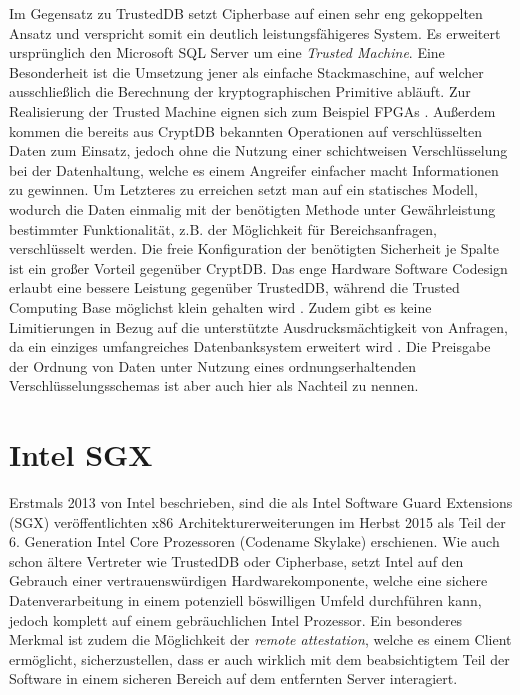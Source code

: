 Im Gegensatz zu TrustedDB setzt Cipherbase \cite{Arasu2012}\cite{Arasu} auf einen sehr eng gekoppelten Ansatz und verspricht somit ein deutlich leistungsfähigeres System. Es erweitert ursprünglich den Microsoft SQL Server um eine \textit{Trusted Machine}. Eine Besonderheit ist die Umsetzung jener als einfache Stackmaschine, auf welcher ausschließlich die Berechnung der kryptographischen Primitive abläuft. Zur Realisierung der Trusted Machine eignen sich zum Beispiel FPGAs \cite{Arasu}. Außerdem kommen die bereits aus CryptDB bekannten Operationen auf verschlüsselten Daten zum Einsatz, jedoch ohne die Nutzung einer schichtweisen Verschlüsselung bei der Datenhaltung, welche es einem Angreifer einfacher macht Informationen zu gewinnen. Um Letzteres zu erreichen setzt man auf ein statisches Modell, wodurch die Daten einmalig mit der benötigten Methode unter Gewährleistung bestimmter Funktionalität, z.B. der Möglichkeit für Bereichsanfragen, verschlüsselt werden. Die freie Konfiguration der benötigten Sicherheit je Spalte ist ein großer Vorteil gegenüber CryptDB. Das enge Hardware Software Codesign erlaubt eine bessere Leistung gegenüber TrustedDB, während die Trusted Computing Base möglichst klein gehalten wird \cite{Arasu}. Zudem gibt es keine Limitierungen in Bezug auf die unterstützte Ausdrucksmächtigkeit von Anfragen, da ein einziges umfangreiches Datenbanksystem erweitert wird \cite{Arasu2013}. Die Preisgabe der Ordnung von Daten unter Nutzung eines ordnungserhaltenden Verschlüsselungsschemas ist aber auch hier als Nachteil zu nennen.

\section{Intel SGX}
Erstmals 2013 von Intel beschrieben, sind die als Intel Software Guard Extensions (SGX) veröffentlichten x86 Architekturerweiterungen im Herbst 2015 als Teil der 6. Generation Intel Core Prozessoren (Codename Skylake) erschienen. Wie auch schon ältere Vertreter wie TrustedDB oder Cipherbase, setzt Intel auf den Gebrauch einer vertrauenswürdigen Hardwarekomponente, welche eine sichere Datenverarbeitung in einem potenziell böswilligen Umfeld durchführen kann, jedoch komplett auf einem gebräuchlichen Intel Prozessor. Ein besonderes Merkmal ist zudem die Möglichkeit der \textit{remote attestation}, welche es einem Client ermöglicht, sicherzustellen, dass er auch wirklich mit dem beabsichtigtem Teil der Software in einem sicheren Bereich auf dem entfernten Server interagiert. 

